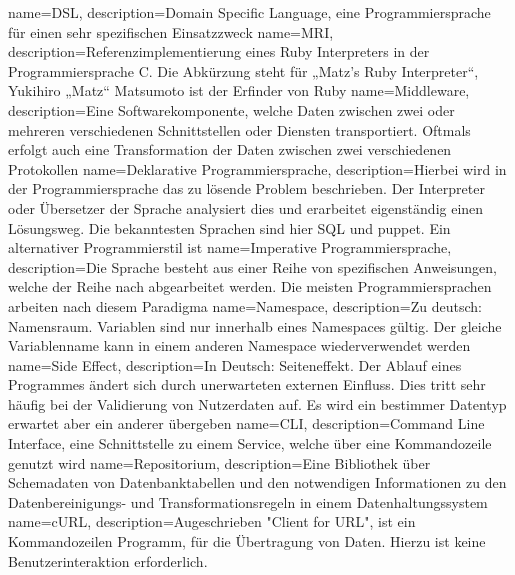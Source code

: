 {
  name=DSL,
  description={Domain Specific Language, eine Programmiersprache für einen sehr
               spezifischen Einsatzzweck}
}
{
  name=MRI,
  description={Referenzimplementierung eines Ruby Interpreters in der
               Programmiersprache C. Die Abkürzung steht für „Matz's Ruby
               Interpreter“, Yukihiro „Matz“ Matsumoto ist der Erfinder von
               Ruby}
}
{
  name=Middleware,
  description={Eine Softwarekomponente, welche Daten zwischen zwei oder
               mehreren verschiedenen Schnittstellen oder Diensten
               transportiert. Oftmals erfolgt auch eine Transformation
               der Daten zwischen zwei verschiedenen Protokollen}
}
{
  name={Deklarative Programmiersprache},
  description={Hierbei wird in der Programmiersprache das zu lösende Problem
               beschrieben. Der Interpreter oder Übersetzer der Sprache
               analysiert dies und erarbeitet eigenständig einen Lösungsweg.
               Die bekanntesten Sprachen sind hier \gls{SQL} und puppet. Ein
               alternativer Programmierstil ist
               }
}
{
  name={Imperative Programmiersprache},
  description={Die Sprache besteht aus einer Reihe von spezifischen
               Anweisungen, welche der Reihe nach abgearbeitet werden. Die
               meisten Programmiersprachen arbeiten nach diesem Paradigma}
}
{
  name=Namespace,
  description={Zu deutsch: Namensraum. Variablen sind nur innerhalb eines
               Namespaces gültig. Der gleiche Variablenname kann in einem
               anderen Namespace wiederverwendet werden}
}
{
  name={Side Effect},
  description={In Deutsch: Seiteneffekt. Der Ablauf eines Programmes ändert
               sich durch unerwarteten externen Einfluss. Dies tritt sehr
               häufig bei der Validierung von Nutzerdaten auf. Es wird ein
               bestimmer Datentyp erwartet aber ein anderer übergeben}
}
{
  name=CLI,
  description={Command Line Interface, eine Schnittstelle zu einem Service,
               welche über eine Kommandozeile genutzt wird}
}
{
  name=Repositorium,
  description={Eine Bibliothek über Schemadaten von Datenbanktabellen und
               den notwendigen Informationen zu den Datenbereinigungs- und
               Transformationsregeln in einem Datenhaltungssystem}
}
{
  name=cURL,
  description={Augeschrieben "Client for URL", ist ein Kommandozeilen Programm,
               für die Übertragung von Daten. Hierzu ist keine
               Benutzerinteraktion erforderlich.}
}
